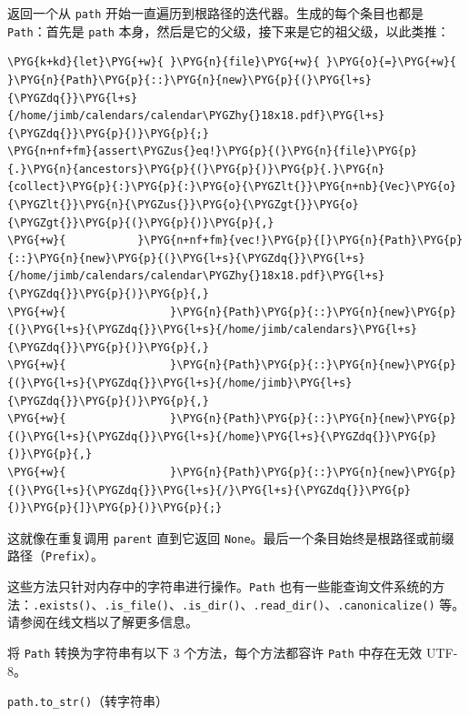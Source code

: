 返回一个从 \texttt{path} 开始一直遍历到根路径的迭代器。生成的每个条目也都是 \texttt{Path}：首先是 \texttt{path} 本身，然后是它的父级，接下来是它的祖父级，以此类推：

\begin{Verbatim}[commandchars=\\\{\},breaklines=true,breakanywhere=true,fontsize=\codefont,xleftmargin=17bp]
\PYG{k+kd}{let}\PYG{+w}{ }\PYG{n}{file}\PYG{+w}{ }\PYG{o}{=}\PYG{+w}{ }\PYG{n}{Path}\PYG{p}{::}\PYG{n}{new}\PYG{p}{(}\PYG{l+s}{\PYGZdq{}}\PYG{l+s}{/home/jimb/calendars/calendar\PYGZhy{}18x18.pdf}\PYG{l+s}{\PYGZdq{}}\PYG{p}{)}\PYG{p}{;}
\PYG{n+nf+fm}{assert\PYGZus{}eq!}\PYG{p}{(}\PYG{n}{file}\PYG{p}{.}\PYG{n}{ancestors}\PYG{p}{(}\PYG{p}{)}\PYG{p}{.}\PYG{n}{collect}\PYG{p}{:}\PYG{p}{:}\PYG{o}{\PYGZlt{}}\PYG{n+nb}{Vec}\PYG{o}{\PYGZlt{}}\PYG{n}{\PYGZus{}}\PYG{o}{\PYGZgt{}}\PYG{o}{\PYGZgt{}}\PYG{p}{(}\PYG{p}{)}\PYG{p}{,}
\PYG{+w}{           }\PYG{n+nf+fm}{vec!}\PYG{p}{[}\PYG{n}{Path}\PYG{p}{::}\PYG{n}{new}\PYG{p}{(}\PYG{l+s}{\PYGZdq{}}\PYG{l+s}{/home/jimb/calendars/calendar\PYGZhy{}18x18.pdf}\PYG{l+s}{\PYGZdq{}}\PYG{p}{)}\PYG{p}{,}
\PYG{+w}{                }\PYG{n}{Path}\PYG{p}{::}\PYG{n}{new}\PYG{p}{(}\PYG{l+s}{\PYGZdq{}}\PYG{l+s}{/home/jimb/calendars}\PYG{l+s}{\PYGZdq{}}\PYG{p}{)}\PYG{p}{,}
\PYG{+w}{                }\PYG{n}{Path}\PYG{p}{::}\PYG{n}{new}\PYG{p}{(}\PYG{l+s}{\PYGZdq{}}\PYG{l+s}{/home/jimb}\PYG{l+s}{\PYGZdq{}}\PYG{p}{)}\PYG{p}{,}
\PYG{+w}{                }\PYG{n}{Path}\PYG{p}{::}\PYG{n}{new}\PYG{p}{(}\PYG{l+s}{\PYGZdq{}}\PYG{l+s}{/home}\PYG{l+s}{\PYGZdq{}}\PYG{p}{)}\PYG{p}{,}
\PYG{+w}{                }\PYG{n}{Path}\PYG{p}{::}\PYG{n}{new}\PYG{p}{(}\PYG{l+s}{\PYGZdq{}}\PYG{l+s}{/}\PYG{l+s}{\PYGZdq{}}\PYG{p}{)}\PYG{p}{]}\PYG{p}{)}\PYG{p}{;}
\end{Verbatim}

这就像在重复调用 \texttt{parent} 直到它返回 \texttt{None}。最后一个条目始终是根路径或前缀路径（\texttt{Prefix}）。

这些方法只针对内存中的字符串进行操作。\texttt{Path} 也有一些能查询文件系统的方法：\texttt{.exists()}、\texttt{.is\_file()}、\texttt{.is\_dir()}、\texttt{.read\_dir()}、\texttt{.canonicalize()} 等。请参阅在线文档以了解更多信息。

将 \texttt{Path} 转换为字符串有以下 3 个方法，每个方法都容许 \texttt{Path} 中存在无效 UTF-8。

\begin{mySidenote}
\texttt{path.to\_str()}（转字符串）
\end{mySidenote}

